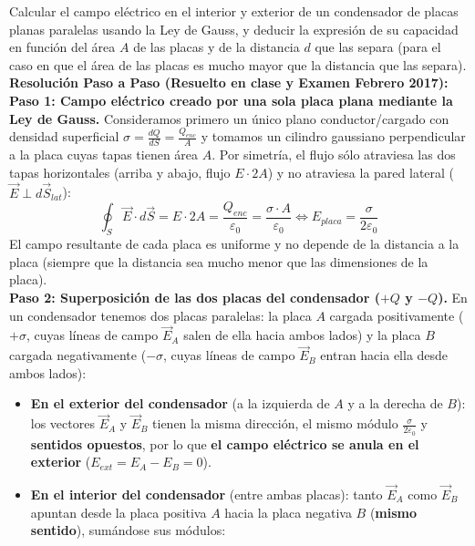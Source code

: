 \begin{ejercicio}
Calcular el campo eléctrico en el interior y exterior de un condensador de placas planas paralelas usando la Ley de Gauss, y deducir la expresión de su capacidad en función del área $A$ de las placas y de la distancia $d$ que las separa (para el caso en que el área de las placas es mucho mayor que la distancia que las separa).
\tcbline
\textbf{Resolución Paso a Paso (Resuelto en clase y Examen Febrero 2017):}\\[4pt]
\textbf{Paso 1: Campo eléctrico creado por una sola placa plana mediante la Ley de Gauss.}
Consideramos primero un único plano conductor/cargado con densidad superficial $\sigma = \frac{dQ}{dS} = \frac{Q_{enc}}{A}$ y tomamos un cilindro gaussiano perpendicular a la placa cuyas tapas tienen área $A$. Por simetría, el flujo sólo atraviesa las dos tapas horizontales (arriba y abajo, flujo $E \cdot 2A$) y no atraviesa la pared lateral ($\vec{E} \perp d\vec{S}_{lat}$):
\begin{equation}
    \oint_S \vec{E}\cdot d\vec{S} = E \cdot 2A = \frac{Q_{enc}}{\varepsilon_0} = \frac{\sigma \cdot A}{\varepsilon_0} \iff E_{placa} = \frac{\sigma}{2\varepsilon_0}
\end{equation}
El campo resultante de cada placa es uniforme y no depende de la distancia a la placa (siempre que la distancia sea mucho menor que las dimensiones de la placa).\\[4pt]
\textbf{Paso 2: Superposición de las dos placas del condensador ($+Q$ y $-Q$).}
En un condensador tenemos dos placas paralelas: la placa $A$ cargada positivamente ($+\sigma$, cuyas líneas de campo $\vec{E}_A$ salen de ella hacia ambos lados) y la placa $B$ cargada negativamente ($-\sigma$, cuyas líneas de campo $\vec{E}_B$ entran hacia ella desde ambos lados):
\begin{itemize}[leftmargin=*]
    \item \textbf{En el exterior del condensador} (a la izquierda de $A$ y a la derecha de $B$): los vectores $\vec{E}_A$ y $\vec{E}_B$ tienen la misma dirección, el mismo módulo $\frac{\sigma}{2\varepsilon_0}$ y \textbf{sentidos opuestos}, por lo que \textbf{el campo eléctrico se anula en el exterior} ($E_{ext} = E_A - E_B = 0$).
    \item \textbf{En el interior del condensador} (entre ambas placas): tanto $\vec{E}_A$ como $\vec{E}_B$ apuntan desde la placa positiva $A$ hacia la placa negativa $B$ (\textbf{mismo sentido}), sumándose sus módulos:

\end{itemize}
\end{ejercicio}
